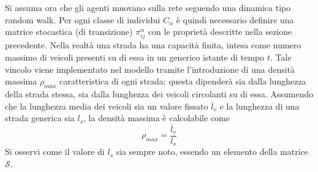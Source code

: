 Si assuma ora che gli agenti muovano sulla rete seguendo una dinamica tipo random walk.
Per ogni classe di individui $C_{\alpha}$ \`e quindi necessario definire una matrice stocastica (di transizione) $\pi_{ij}^{\alpha}$ con le propriet\`a descritte nella sezione precedente.
Nella realt\`a una strada ha una capacit\`a finita, intesa come numero massimo di veicoli presenti su di essa in un generico istante di tempo $t$.
Tale vincolo viene implementato nel modello tramite l'introduzione di una densit\`a massima $\rho_{max}$ caratteristica di ogni strada: questa dipender\`a sia dalla lunghezza della strada stessa, sia dalla lunghezza dei veicoli circolanti su di essa.
Assumendo che la lunghezza media dei veicoli sia un valore fissato $\bar{l}_v$ e la lunghezza di una strada generica sia $l_s$, la densit\`a massima \`e calcolabile come
\begin{equation}
    \rho_{max}=\frac{\bar{l}_v}{l_s}
    \label{eq:density}
\end{equation}
Si osservi come il valore di $l_s$ sia sempre noto, essendo un elemento della matrice $\mathcal{S}$.

